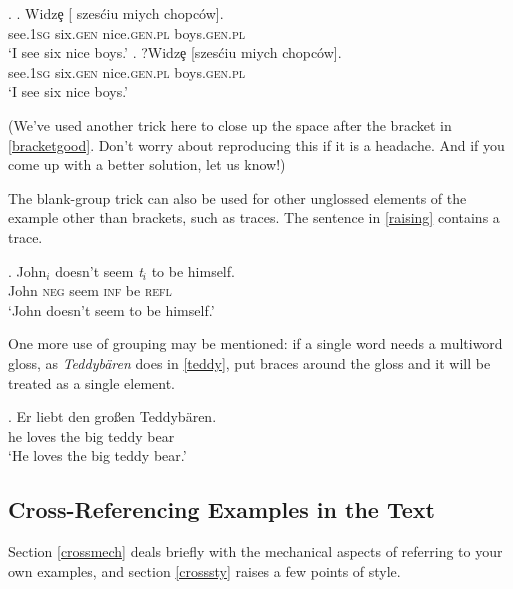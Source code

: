 \documentclass[letterpaper,12pt, twoside]{article}
\begin{document}
\ex. \label{bracket}
\ag. Widz\c{e}  [ \hspace{-3pt}szes\'ciu {mi\textltilde ych} {ch\textltilde opc\'ow}]. \\ 
see.\textsc{{\footnotesize 1}sg} {} \hspace{-3pt}six.\textsc{gen} nice.\textsc{gen.pl} boys.\textsc{gen.pl} \\ 
 `I see six nice boys.' \label{bracketgood}
\bg. ?Widz\c{e}  [szes\'ciu {mi\textltilde ych} {ch\textltilde opc\'ow}]. \\ 
see.\textsc{{\footnotesize 1}sg} six.\textsc{gen} nice.\textsc{gen.pl} boys.\textsc{gen.pl} \\ 
 `I see six nice boys.' \label{bracketbad}

(We've used another trick here to close up the space after the bracket in \ref{bracketgood}. Don't worry about reproducing this if it is a headache. And if you come up with a better solution, let us know!)

The blank-group trick can also be used for other unglossed elements of the example other than brackets, such as traces. The sentence in \ref{raising} contains a trace.

\exg. John$_i$ doesn't seem \emph{t}$_i$ to be himself. \\
John	\textsc{neg} seem {} \textsc{inf} be \textsc{refl} \\
`John doesn't seem to be himself.' \label{raising}


One more use of grouping may be mentioned: if a single word needs a multiword gloss, as \emph{Teddyb\"aren} does in \ref{teddy}, put braces around the gloss and it will be treated as a single element.

\exg. Er liebt den gro{\ss}en  Teddyb\"aren.\\
he loves the big {teddy bear}\\
`He loves the big teddy bear.'\label{teddy}


\subsection{Cross-Referencing Examples in the Text}\label{seccross}
Section \ref{crossmech} deals briefly with the mechanical aspects of referring to your own examples, and  section \ref{crosssty} raises a few points of style.
\end{document}
